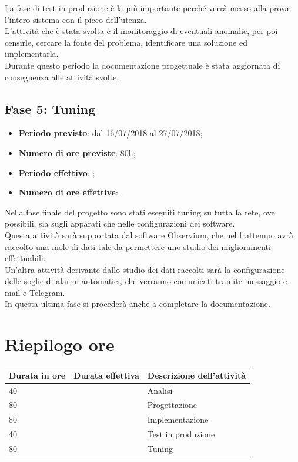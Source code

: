 \documentclass[Tesi.tex]{subfiles}
\begin{document}
La fase di test in produzione è la più importante perché verrà messo alla prova l'intero sistema con il picco dell'utenza. \\
L'attività che è stata svolta è il monitoraggio di eventuali anomalie, per poi censirle, cercare la fonte del problema, identificare una soluzione ed implementarla. \\
Durante questo periodo la documentazione progettuale è stata aggiornata di conseguenza alle attività svolte.\\

	

\subsection{Fase 5: Tuning}
\begin{itemize}
	\item \textbf{Periodo previsto}: dal 16/07/2018 al 27/07/2018;
	\item \textbf{Numero di ore previste}: 80h;
	\item \textbf{Periodo effettivo}: ;
	\item \textbf{Numero di ore effettive}: .
\end{itemize}
	
Nella fase finale del progetto sono stati eseguiti tuning su tutta la rete, ove possibili, sia sugli apparati che nelle configurazioni dei software. \\
Questa attività sarà supportata dal software Observium, che nel frattempo avrà raccolto una mole di dati tale da permettere uno studio dei miglioramenti effettuabili.\\
Un'altra attività derivante dallo studio dei dati raccolti sarà la configurazione delle soglie di alarmi automatici, che verranno comunicati tramite messaggio e-mail e Telegram. \\
In questa ultima fase si procederà anche a completare la documentazione. \\
	

\section{Riepilogo ore}
    \begin{longtable}{|p{3cm}|p{4cm}|p{6cm}|}
	\hline
	{\bf Durata in ore} & {\bf Durata effettiva} & {\bf Descrizione dell'attività} \\
	\hline
	40 & & Analisi \\
	\hline
	80 & & Progettazione \\
	\hline
	80 & & Implementazione \\
	\hline
	40 & & Test in produzione \\
	\hline
	80 & & Tuning \\
	\hline
	
\end{longtable}
\end{document}
